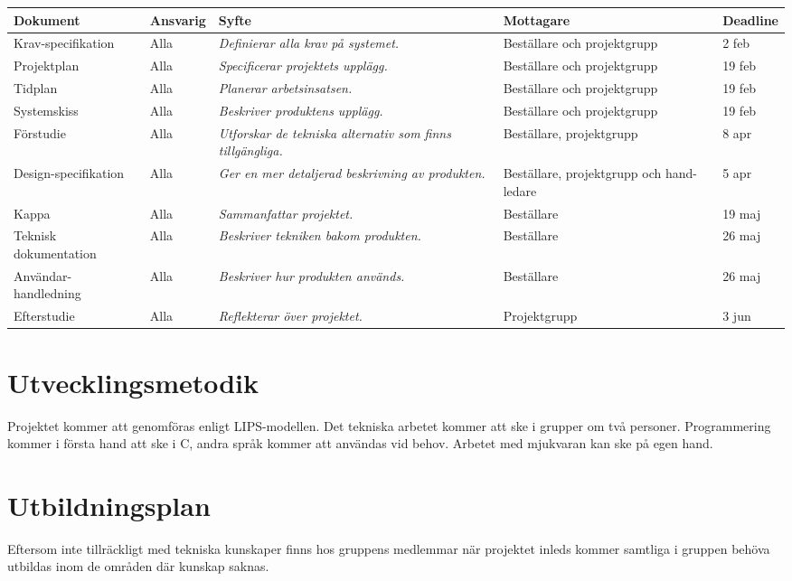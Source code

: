 \documentclass[11pt]{article}
\begin{document}
\begin{flushleft}
\begin{longtable}{| p{.17\linewidth} | p{.11\linewidth} | p{.31\linewidth} | p{.15\linewidth} | p{.11\linewidth} |} \hline
\textbf{Dokument} & \textbf{Ansvarig} & \textbf{Syfte} & \textbf{Mottagare} & \textbf{Deadline} \\ \hline
Krav-specifikation & Alla & \textit{Definierar alla krav på systemet.} & Beställare och projektgrupp & 2 feb \\ \hline
Projektplan & Alla & \textit{Specificerar projektets upplägg.} & Beställare och projektgrupp & 19 feb \\ \hline
Tidplan & Alla & \textit{Planerar arbetsinsatsen.} & Beställare och projektgrupp & 19 feb \\ \hline
Systemskiss & Alla & \textit{Beskriver produktens upplägg.} & Beställare och projektgrupp & 19 feb \\ \hline
Förstudie & Alla & \textit{Utforskar de tekniska alternativ som finns tillgängliga.} & Beställare, projektgrupp & 8 apr \\ \hline
Design-specifikation & Alla & \textit{Ger en mer detaljerad beskrivning av produkten.} & Beställare, projektgrupp och hand-ledare & 5 apr \\ \hline
Kappa & Alla & \textit{Sammanfattar projektet.} & Beställare & 19 maj \\ \hline
Teknisk \mbox{dokumentation} & Alla & \textit{Beskriver tekniken bakom produkten.} & Beställare & 26 maj\\ \hline
Användar-handledning & Alla & \textit{Beskriver hur produkten används.} & Beställare & 26 maj \\ \hline
Efterstudie & Alla & \textit{Reflekterar över projektet.} & Projektgrupp & 3 jun \\ \hline

\end{longtable}

\pagebreak
\section{Utvecklingsmetodik}
Projektet kommer att genomföras enligt LIPS-modellen. Det tekniska arbetet kommer att ske i grupper om två personer. Programmering kommer i första hand att ske i C, andra språk kommer att användas vid behov. Arbetet med mjukvaran kan ske på egen hand.

\section{Utbildningsplan}
Eftersom inte tillräckligt med tekniska kunskaper finns hos gruppens medlemmar när projektet inleds kommer samtliga i gruppen behöva utbildas inom de områden där kunskap saknas. 

\end{flushleft}
\end{document}
